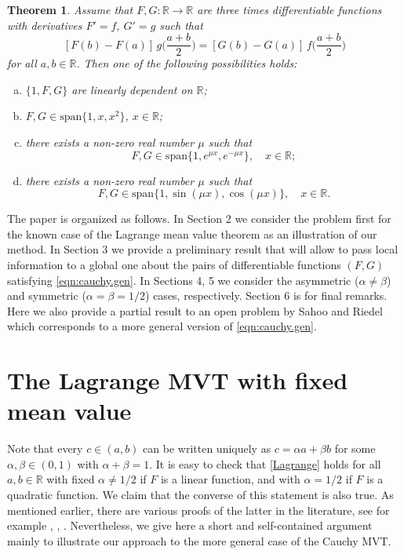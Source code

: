 \documentclass{birkjour}
\newtheorem{theorem}{Theorem}
\begin{document}
\begin{theorem} 
\label{thm:sym.cauchy.main}
Assume that $F,G: {{\mathbb R}} \to {{\mathbb R}}$ are three times differentiable functions with derivatives $F'=f$, $G'=g$ such that
\begin{equation}
\label{eqn:cauchy.sym1}
[F(b)-F(a)]\,g\bigl(\frac{a+b}{2}\bigr) = [G(b)-G(a)]\,f\bigl(\frac{a+b}{2}\bigr) 
\end{equation}
for all $a,b\in{{\mathbb R}}$. Then one of the following possibilities holds: 

\begin{enumerate}[(a)]

\item $\{1, F, G\}$ are linearly dependent on ${{\mathbb R}}$;

\item $F,G \in \mathrm{span} \{1,x,x^2\}$, $x\in{{\mathbb R}}$;

\item there exists a non-zero real number $\mu$ such that 
\[
F,G \in \mathrm{span} \{1,e^{\mu x}, e^{-\mu x}\}, \quad x\in{{\mathbb R}};
\]

\item there exists a non-zero real number $\mu$ such that 
\[
F,G \in \mathrm{span} \{1,\sin(\mu x), \cos(\mu x)\}, \quad x\in{{\mathbb R}}.
\]
\end{enumerate} 
\end{theorem}

The paper is organized as follows. In Section 2 we consider the problem first for the known case of the Lagrange mean value theorem  as an illustration of our method. In Section 3 we provide a preliminary result that will allow to pass local information to a global one about the pairs of differentiable functions $(F,G)$ 
satisfying \eqref{eqn:cauchy.gen}. In Sections 4, 5 we consider the asymmetric ($\alpha\neq\beta$) and symmetric ($\alpha=\beta=1/2$) cases, respectively. Section 6 is for final remarks. Here we also provide a partial result to an open problem by Sahoo and Riedel which corresponds to a more general version of \eqref{eqn:cauchy.gen}.

\section{The Lagrange MVT with fixed mean value} 

Note that every $c \in (a,b)$ can be written uniquely as $c=\alpha a+\beta b$ for some $\alpha,\beta\in (0,1)$ with $\alpha+\beta=1$. It is easy to check that \eqref{Lagrange} holds for all $a,b\in{{\mathbb R}}$ with fixed $\alpha \neq 1/2$ if $F$ is a linear function, and with  $\alpha = 1/2$ if $F$ is a quadratic function. We claim that the converse of this statement is also true. As mentioned earlier, there are various proofs of the latter in the literature, see for example \cite{Aczel}, \cite{Haruki} , \cite{Sahoo-Riedel}. Nevertheless, we give here  a short and self-contained argument mainly to illustrate our approach to the more general case of the Cauchy MVT.
\end{document}
